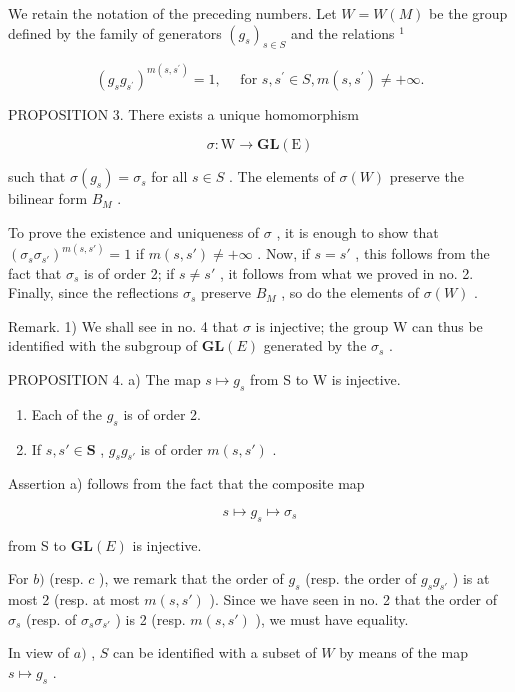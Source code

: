 We retain the notation of the preceding numbers. Let \(W = W(M)\) be the group defined by the family of generators \((g_{s})_{s \in S}\) and the relations \(^{1}\)

\[
\left(g _ {s} g _ {s ^ {\prime}}\right) ^ {m \left(s, s ^ {\prime}\right)} = 1, \quad \text { for } s, s ^ {\prime} \in S, m \left(s, s ^ {\prime}\right) \neq + \infty .
\]

PROPOSITION 3. There exists a unique homomorphism

\[
\sigma : \mathrm{W} \rightarrow \mathbf {G L} (\mathrm{E})
\]

such that \(\sigma(g_s) = \sigma_s\) for all \(s \in S\) . The elements of \(\sigma(W)\) preserve the bilinear form \(B_M\) .

To prove the existence and uniqueness of \(\sigma\) , it is enough to show that \((\sigma_s \sigma_{s'})^{m(s, s')} = 1\) if \(m(s, s') \neq +\infty\) . Now, if \(s = s'\) , this follows from the fact that \(\sigma_s\) is of order 2; if \(s \neq s'\) , it follows from what we proved in no. 2. Finally, since the reflections \(\sigma_s\) preserve \(B_M\) , so do the elements of \(\sigma(W)\) .

Remark. 1) We shall see in no. 4 that \(\sigma\) is injective; the group W can thus be identified with the subgroup of \(\mathbf{GL}(E)\) generated by the \(\sigma_s\) .

PROPOSITION 4. a) The map \(s \mapsto g_s\) from S to W is injective.

\begin{enumerate}
\def\labelenumi{\alph{enumi})}
\setcounter{enumi}{1}
\item
  Each of the \(g_{s}\) is of order 2.
\item
  If \(s, s' \in \mathbf{S}\) , \(g_s g_{s'}\) is of order \(m(s, s')\) .
\end{enumerate}

Assertion a) follows from the fact that the composite map

\[
s \mapsto g _ {s} \mapsto \sigma_ {s}
\]

from S to \(\mathbf{GL}(E)\) is injective.

For \(b)\) (resp. \(c\) ), we remark that the order of \(g_{s}\) (resp. the order of \(g_{s}g_{s'}\) ) is at most 2 (resp. at most \(m(s, s')\) ). Since we have seen in no. 2 that the order of \(\sigma_{s}\) (resp. of \(\sigma_{s}\sigma_{s'}\) ) is 2 (resp. \(m(s, s')\) ), we must have equality.

In view of \(a)\) , \(S\) can be identified with a subset of \(W\) by means of the map \(s \mapsto g_s\) .


